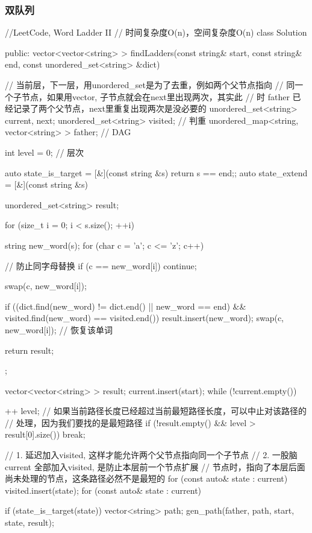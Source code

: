 \subsubsection{双队列}

\begin{Code}
//LeetCode, Word Ladder II
// 时间复杂度O(n)，空间复杂度O(n)
class Solution {
public:
    vector<vector<string> > findLadders(const string& start,
            const string& end, const unordered_set<string> &dict) {
        // 当前层，下一层，用unordered_set是为了去重，例如两个父节点指向
        // 同一个子节点，如果用vector, 子节点就会在next里出现两次，其实此
        // 时 father 已经记录了两个父节点，next里重复出现两次是没必要的
        unordered_set<string> current, next;
        unordered_set<string> visited; // 判重
        unordered_map<string, vector<string> > father; // DAG

        int level = 0;  // 层次

        auto state_is_target = [&](const string &s) {return s == end;};
        auto state_extend = [&](const string &s) {
            unordered_set<string> result;

            for (size_t i = 0; i < s.size(); ++i) {
                string new_word(s);
                for (char c = 'a'; c <= 'z'; c++) {
                    // 防止同字母替换
                    if (c == new_word[i]) continue;

                    swap(c, new_word[i]);

                    if ((dict.find(new_word) != dict.end() || new_word == end) &&
                             visited.find(new_word) == visited.end()) {
                        result.insert(new_word);
                    }
                    swap(c, new_word[i]); // 恢复该单词
                }
            }

            return result;
        };

        vector<vector<string> > result;
        current.insert(start);
        while (!current.empty()) {
            ++ level;
            // 如果当前路径长度已经超过当前最短路径长度，可以中止对该路径的
            // 处理，因为我们要找的是最短路径
            if (!result.empty() && level > result[0].size()) break;

            // 1. 延迟加入visited, 这样才能允许两个父节点指向同一个子节点
            // 2. 一股脑current 全部加入visited, 是防止本层前一个节点扩展
            // 节点时，指向了本层后面尚未处理的节点，这条路径必然不是最短的
            for (const auto& state : current)
                visited.insert(state);
            for (const auto& state : current) {
                if (state_is_target(state)) {
                    vector<string> path;
                    gen_path(father, path, start, state, result);
                }

}}}}
\end{Code}
